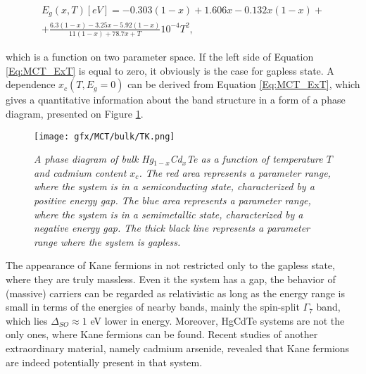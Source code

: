 \documentclass[titlepage,a4paper]{book}
\begin{document}
\begin{equation}
\begin{aligned}
\label{Eq:MCT_ExT}
E_g (x,T)[eV] = -0.303(1-x) + 1.606x - 0.132x(1-x) +\\ +\frac{6.3(1-x)-3.25x-5.92(1-x)}{11(1-x)+78.7x+T}10^{-4}T^2,
\end{aligned}
\end{equation}

which is a function on two parameter space. If the left side of Equation \ref{Eq:MCT_ExT} is equal to zero, it obviously is the case for gapless state. A dependence $x_c(T, E_g = 0)$ can be derived from Equation \ref{Eq:MCT_ExT}, which gives a quantitative information about the band structure in a form of a phase diagram, presented on Figure \ref{fig:MCT_TK}. 
\begin{figure}[ht]
	\centering
	\texttt{[image: gfx/MCT/bulk/TK.png]}
	\vspace{-10pt}
	\caption{\textit{A phase diagram of bulk Hg$_{1-x}$Cd$_x$Te as a function of temperature $T$ and cadmium content $x_c$. The red area represents a parameter range, where the system is in a semiconducting state, characterized by a positive energy gap. The blue area represents a parameter range, where the system is in a semimetallic state, characterized by a negative energy gap. The thick black line represents a parameter range where the system is gapless.}}
	\label{fig:MCT_TK}
\end{figure} 

The appearance of Kane fermions in not restricted only to the gapless state, where they are truly massless. Even it the system has a gap, the behavior of (massive) carriers can be regarded as relativistic as long as the energy range is small in terms of the energies of nearby bands, mainly the spin-split $\Gamma_7$ band, which lies $\Delta_{SO} \approx 1$ eV \cite{Novik_MCT} lower in energy. Moreover, HgCdTe systems are not the only ones, where Kane fermions can be found. Recent studies of another extraordinary material, namely cadmium arsenide, revealed that Kane fermions are indeed potentially present in that system.
\end{document}
